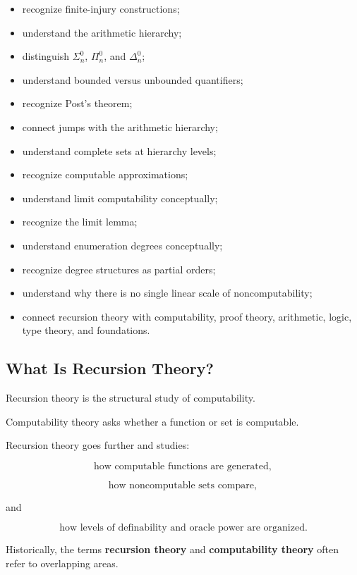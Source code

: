 {\begin{itemize}
    \item recognize finite-injury constructions;
    \item understand the arithmetic hierarchy;
    \item distinguish \(\Sigma^0_n\), \(\Pi^0_n\), and \(\Delta^0_n\);
    \item understand bounded versus unbounded quantifiers;
    \item recognize Post's theorem;
    \item connect jumps with the arithmetic hierarchy;
    \item understand complete sets at hierarchy levels;
    \item recognize computable approximations;
    \item understand limit computability conceptually;
    \item recognize the limit lemma;
    \item understand enumeration degrees conceptually;
    \item recognize degree structures as partial orders;
    \item understand why there is no single linear scale of
          noncomputability;
    \item connect recursion theory with computability, proof theory,
          arithmetic, logic, type theory, and foundations.
\end{itemize}
}

\subsection{What Is Recursion Theory?}
\label{subsec:what-is-recursion-theory}

Recursion theory is the structural study of computability.

Computability theory asks whether a function or set is computable.

Recursion theory goes further and studies:

\[
\boxed{
\text{how computable functions are generated},
}
\]

\[
\boxed{
\text{how noncomputable sets compare},
}
\]

and

\[
\boxed{
\text{how levels of definability and oracle power are organized}.
}
\]

Historically, the terms \textbf{recursion theory} and
\textbf{computability theory} often refer to overlapping areas.

